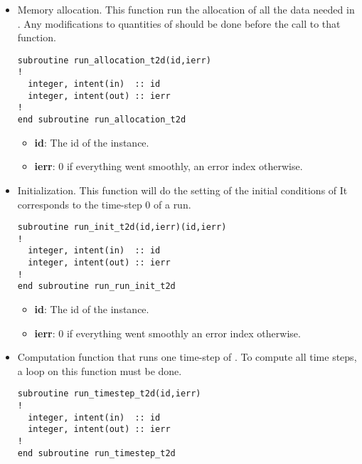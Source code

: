 \begin{itemize}
\begin{WarningBlock}{Warning:}
\centering
With the API we are not using the temporary folder (this folder was created by
the \python environment and all the file declared in the steering file
where copied and renamed inside that folder) which means that the name and path
given in the steering file will be used.
\end{WarningBlock}

\item Memory allocation. This function run the allocation of all the data
  needed in . Any modifications to quantities of 
  should be done before the call to that function.

\begin{lstlisting}
subroutine run_allocation_t2d(id,ierr)
!
  integer, intent(in)  :: id
  integer, intent(out) :: ierr
!
end subroutine run_allocation_t2d
\end{lstlisting}

\begin{itemize}
\item \textbf{id}: The id of the instance.
\item \textbf{ierr}: 0 if everything went smoothly, an error index otherwise.
\end{itemize}

\item Initialization. This function will do the setting of the initial
  conditions of  It corresponds to the time-step 0 of a
   run.

\begin{lstlisting}
subroutine run_init_t2d(id,ierr)(id,ierr)
!
  integer, intent(in)  :: id
  integer, intent(out) :: ierr
!
end subroutine run_run_init_t2d
\end{lstlisting}

\begin{itemize}
\item \textbf{id}: The id of the instance.
\item \textbf{ierr}: 0 if everything went smoothly an error index otherwise.
\end{itemize}


\item Computation function that runs one time-step of . To compute
  all time steps, a loop on this function must be done.

\begin{lstlisting}
subroutine run_timestep_t2d(id,ierr)
!
  integer, intent(in)  :: id
  integer, intent(out) :: ierr
!
end subroutine run_timestep_t2d
\end{lstlisting}



\end{itemize}
